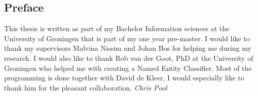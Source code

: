 \documentclass[
10pt, %
a4paper, %
oneside, %
headinclude,footinclude, %
BCOR5mm, %
]{scrartcl}
\begin{document}
\newpage
\begin{titlepage}
\section*{Preface} %
This thesis is written as part of my Bachelor Information sciences at the University of Groningen that is part of my one year pre-master.  
\vl
I would like to thank my supervisors Malvina Nissim and Johan Bos for helping me during my research. I would also like to thank Rob van der Goot, PhD at the University of Groningen who helped me with creating a Named Entity Classifier.
\vl
Most of the programming is done together with David de Kleer, I would especially like to thank him for the pleasant collaboration.
\vl
\textit{Chris Pool}
\pagestyle{empty}
\end{titlepage}

\newpage
\setcounter{tocdepth}{3} %
\tableofcontents %

\listoffigures %

\listoftables %

\lstlistoflistings
\newpage
\end{document}
